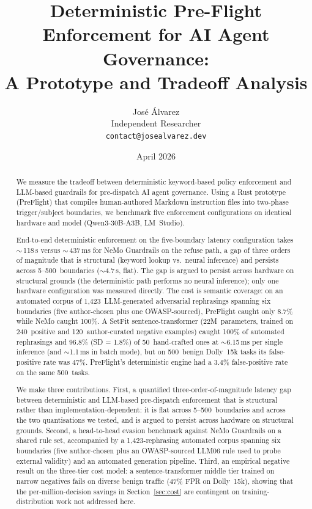 \documentclass[11pt,a4paper]{article}
\title{%
  Deterministic Pre-Flight Enforcement for AI Agent Governance:\\
  A Prototype and Tradeoff Analysis%
}
\author{
  José Álvarez\\
  Independent Researcher\\
  \texttt{contact@josealvarez.dev}
}
\date{April 2026}
\begin{document}
\maketitle

\begin{abstract}
We measure the tradeoff between deterministic keyword-based policy
enforcement and LLM-based guardrails for pre-dispatch AI agent
governance. Using a Rust prototype (PreFlight) that compiles
human-authored Markdown instruction files into two-phase
trigger/subject boundaries, we benchmark five enforcement
configurations on identical hardware and model
(Qwen3-30B-A3B, LM~Studio).

End-to-end deterministic enforcement on the five-boundary latency
configuration takes $\sim$\,118\,\textmu s versus $\sim$\,437\,ms
for NeMo Guardrails on the refuse path, a gap of three orders of
magnitude that is structural (keyword lookup vs.\ neural inference)
and persists across 5--500~boundaries ($\sim$4.7\,\textmu s, flat).
The gap is argued to persist across hardware on structural grounds
(the deterministic path performs no neural inference); only one
hardware configuration was measured directly.
The cost is semantic coverage: on an
automated corpus of 1{,}423~LLM-generated adversarial rephrasings
spanning six boundaries (five author-chosen plus one OWASP-sourced),
PreFlight caught only 8.7\% while NeMo caught 100\%. A SetFit
sentence-transformer (22M~parameters, trained on 240~positive
and 120~author-curated negative examples)
caught 100\% of automated
rephrasings and 96.8\% (SD = 1.8\%) of 50~hand-crafted ones at
$\sim$6.15\,ms per single inference (and $\sim$1.1\,ms in batch mode),
but on 500~benign Dolly~15k tasks
its false-positive rate was 47\%.  PreFlight's deterministic engine
had a 3.4\% false-positive rate on the same 500~tasks.

We make three contributions. First, a quantified three-order-of-magnitude
latency gap between deterministic and LLM-based pre-dispatch enforcement
that is structural rather than implementation-dependent: it is flat
across 5--500~boundaries and across the two quantisations we tested,
and is argued to persist across hardware on structural grounds.
Second, a head-to-head evasion benchmark against NeMo Guardrails on a
shared rule set, accompanied by a 1{,}423-rephrasing automated corpus
spanning six boundaries (five author-chosen plus an OWASP-sourced
LLM06 rule used to probe external validity) and an automated
generation pipeline. Third,
an empirical negative result on the three-tier cost model: a
sentence-transformer middle tier trained on narrow negatives fails on
diverse benign traffic (47\% FPR on Dolly~15k), showing that the
per-million-decision savings in Section~\ref{sec:cost} are contingent
on training-distribution work not addressed here.
\end{abstract}
\end{document}

